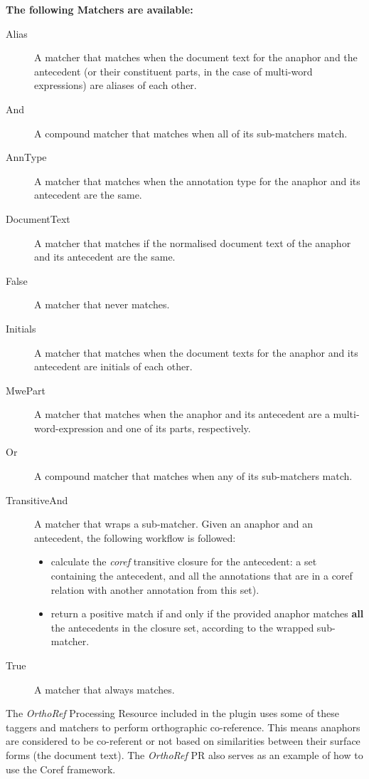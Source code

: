 \textbf{The following Matchers are available:}
\begin{description}
\item[Alias] A matcher that matches when the document text for the anaphor and
  the antecedent (or their constituent parts, in the case of multi-word
  expressions) are aliases of each other.
\item[And] A compound matcher that matches when all of its sub-matchers match. 
\item[AnnType] A matcher that matches when the annotation type for the anaphor
  and its antecedent are the same.
\item[DocumentText] A matcher that matches if the normalised document text of
  the anaphor and its antecedent are the same.
\item[False] A matcher that never matches.
\item[Initials] A matcher that matches when the document texts for the anaphor
  and its antecedent are initials of each other.
\item[MwePart] A matcher that matches when the anaphor and its antecedent are a
multi-word-expression and one of its parts, respectively.
\item[Or] A compound matcher that matches when any of its sub-matchers match.
\item[TransitiveAnd] A matcher that wraps a sub-matcher. Given an anaphor and an
  antecedent, the following workflow is followed:
  \begin{itemize}
    \item calculate the {\em coref} transitive closure for the antecedent: a
    set containing the antecedent, and all the annotations that are in a coref
    relation with another annotation from this set).
    \item return a positive match if and only if the provided anaphor matches
    {\bf all} the antecedents in the closure set, according to the wrapped
    sub-matcher.
  \end{itemize}
\item[True] A matcher that always matches.
\end{description}

The {\em OrthoRef} Processing Resource included in the plugin uses some of these
taggers and matchers to perform orthographic co-reference. This means anaphors
are considered to be co-referent or not based on similarities between their
surface forms (the document text). The {\em OrthoRef} PR also serves as an
example of how to use the Coref framework.

